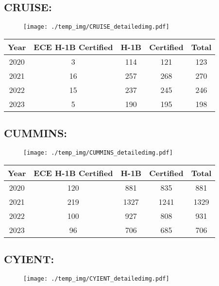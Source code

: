 \documentclass{article}%
\begin{document}
%
\newpage%
\subsection{CRUISE:}%
\label{subsec:CRUISE}%
\label{CRUISEdetailed}%


\begin{figure}[htbp]%
\centering%
\texttt{[image: ./temp\_img/CRUISE\_detailedimg.pdf]}%
\end{figure}

%
\begin{longtable}{c|c|c|c|c}%
\hline%
Year&ECE H{-}1B Certified&H{-}1B&Certified&Total\\%
\hline%
2020&3&114&121&123\\%
\hline%
2021&16&257&268&270\\%
\hline%
2022&15&237&245&246\\%
\hline%
2023&5&190&195&198\\%
\hline%
\end{longtable}

%
\newpage%
\subsection{CUMMINS:}%
\label{subsec:CUMMINS}%
\label{CUMMINSdetailed}%


\begin{figure}[htbp]%
\centering%
\texttt{[image: ./temp\_img/CUMMINS\_detailedimg.pdf]}%
\end{figure}

%
\begin{longtable}{c|c|c|c|c}%
\hline%
Year&ECE H{-}1B Certified&H{-}1B&Certified&Total\\%
\hline%
2020&120&881&835&881\\%
\hline%
2021&219&1327&1241&1329\\%
\hline%
2022&100&927&808&931\\%
\hline%
2023&96&706&685&706\\%
\hline%
\end{longtable}

%
\newpage%
\subsection{CYIENT:}%
\label{subsec:CYIENT}%
\label{CYIENTdetailed}%


\begin{figure}[htbp]%
\centering%
\texttt{[image: ./temp\_img/CYIENT\_detailedimg.pdf]}%
\end{figure}
\end{document}
